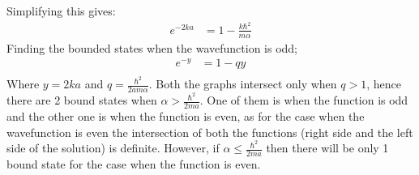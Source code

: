 \documentclass[addpoints]{exam}
\begin{document}
\begin{questions}
\begin{solution}
\begin{enumerate}
                  Simplifying this gives:
                  \begin{align*}
                      e^{-2ka} & = 1 - \frac{k\hbar^2}{m\alpha}
                  \end{align*}
                  Finding the bounded states when the wavefunction is odd;
                  \begin{align*}
                      e^{-y} & = 1 - qy \\
                  \end{align*}
                  Where $y = 2ka$ and $\displaystyle q = \frac{\hbar^2}{2am\alpha}$. Both the graphs intersect only when $q>1$, hence there are 2 bound states when $\displaystyle\alpha > \frac{\hbar^2}{2ma}$. One of them is when the function is odd and the other one is when the function is even, as for the case when the wavefunction is even the intersection of both the functions (right side and the left side of the solution) is definite. However, if $\displaystyle\alpha \leq \frac{\hbar^2}{2ma}$ then there will be only 1 bound state for the case when the function is even.
        \end{enumerate}

    \end{solution}
\end{questions}
% 
\end{document}
